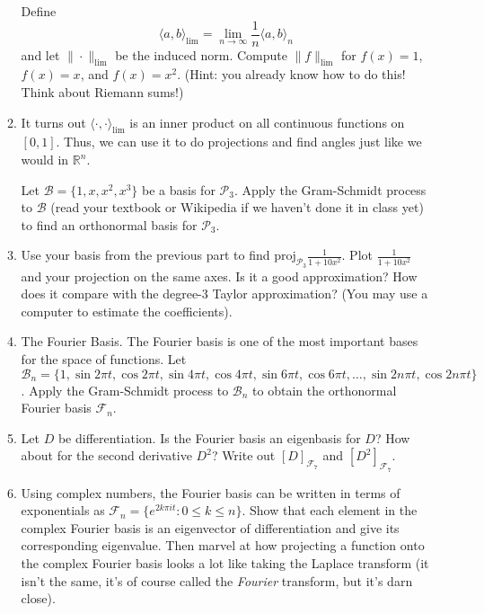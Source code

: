 \documentclass[letter]{article}
\newcommand{\R}{\mathbb{R}}
\newcommand{\proj}{\mathrm{proj}}
\begin{document}
\begin{enumerate}
\begin{enumerate}
					Define
					\[
						\langle a,b\rangle_{\lim} = \lim_{n\to\infty} \frac{1}{n}\langle a,b\rangle_n
					\]
					and let $\|\cdot\|_{\lim}$ be the induced norm.  Compute $\|f\|_{\lim}$ 
					for $f(x)=1$, $f(x)=x$, and $f(x)=x^2$.  (Hint: you already know how to do this!  Think
					about Riemann sums!)
				\item It turns out $\langle \cdot,\cdot\rangle_{\lim}$ is an inner product on all continuous
					functions on $[0,1]$.  Thus, we can use it to do projections and find angles just
					like we would in $\R^n$.  

					Let $\mathcal B=\{1,x,x^2,x^3\}$ be a basis for $\mathcal P_3$.  Apply the Gram-Schmidt process
					to $\mathcal B$ (read your textbook or Wikipedia if we haven't done it in class yet) to
					find an orthonormal basis for $\mathcal P_3$.
				\item Use your basis from the previous part to find $\proj_{\mathcal P_3} \tfrac{1}{1+10x^2}$.  Plot
					$\tfrac{1}{1+10x^2}$ and your projection on the same axes.  Is it a good approximation?  How
					does it compare with the degree-3 Taylor approximation? (You may use a computer
					to estimate the coefficients).

				\item {\sc The Fourier Basis}.  The Fourier basis is one of the most important bases for
					the space of functions.  Let $\mathcal B_n=\{1,\sin 2\pi t,\cos 2\pi t,\sin 4\pi t,\cos 4\pi t,\sin 6\pi t,\cos 6\pi t,
					\ldots, \sin 2n\pi t,\cos 2n\pi t\}$.  Apply the Gram-Schmidt process to $\mathcal B_n$
					to obtain the orthonormal Fourier basis $\mathcal F_n$.
				\item Let $D$ be differentiation.  Is the Fourier basis an eigenbasis for $D$?  How
					about for the second derivative $D^2$? Write out 
					$[D]_{\mathcal F_7}$ and $[D^2]_{\mathcal F_7}$.
				\item Using complex numbers, the Fourier basis can be written in terms of exponentials
					as $\mathcal F_n=\{ e^{2k\pi i t}: 0\leq k\leq n\}$.  Show that each element in
					the complex Fourier basis is an eigenvector of differentiation and give its
					corresponding eigenvalue.  Then marvel at how projecting a function onto the complex
					Fourier basis looks a lot like taking the Laplace transform (it isn't the same, it's
					of course called the \emph{Fourier} transform, but it's darn close).
			\end{enumerate}


\end{enumerate}
\end{document}
